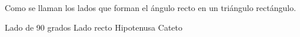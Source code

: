 
\question Como se llaman los lados que forman el ángulo recto en un
          triángulo rectángulo.

  \begin{oneparchoices}
    \choice Lado de 90 grados
    \choice Lado recto
    \choice Hipotenusa
    \CorrectChoice Cateto
  \end{oneparchoices}
  \answerline[D]
